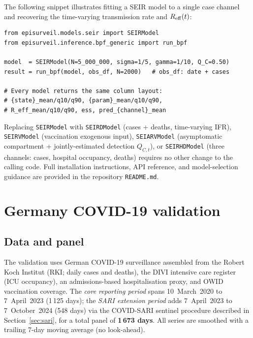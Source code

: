 \documentclass[11pt]{article}
\begin{document}
The following snippet illustrates fitting a SEIR model to a single case
channel and recovering the time-varying transmission rate and $R_{\rm eff}(t)$:

\begin{verbatim}
from episurveil.models.seir import SEIRModel
from episurveil.inference.bpf_generic import run_bpf

model  = SEIRModel(N=5_000_000, sigma=1/5, gamma=1/10, Q_C=0.50)
result = run_bpf(model, obs_df, N=2000)   # obs_df: date + cases

# Every model returns the same column layout:
# {state}_mean/q10/q90, {param}_mean/q10/q90,
# R_eff_mean/q10/q90, ess, pred_{channel}_mean
\end{verbatim}

Replacing \texttt{SEIRModel} with \texttt{SEIRDModel} (cases + deaths,
time-varying IFR), \texttt{SEIRVModel} (vaccination exogenous input),
\texttt{SEIARVModel} (asymptomatic compartment + jointly-estimated
detection $Q_{C,t}$), or \texttt{SEIRHDModel} (three channels:
cases, hospital occupancy, deaths) requires no other change to the
calling code.
Full installation instructions, API reference, and model-selection
guidance are provided in the repository \texttt{README.md}.


\section{Germany COVID-19 validation}
\label{sec:validation}

\subsection{Data and panel}

The validation uses German COVID-19 surveillance assembled from the
Robert Koch Institut (RKI; daily cases and deaths), the DIVI intensive
care register (ICU occupancy), an admissions-based hospitalisation proxy,
and OWID vaccination coverage.
The \emph{core reporting period} spans 10~March~2020 to 7~April~2023
(1\,125 days); the \emph{SARI extension period} adds 7~April~2023 to
7~October~2024 (548 days) via the COVID-SARI sentinel procedure described
in Section~\ref{sec:sari}, for a total panel of \textbf{1\,673 days}.
All series are smoothed with a trailing 7-day moving average (no
look-ahead).
\end{document}
